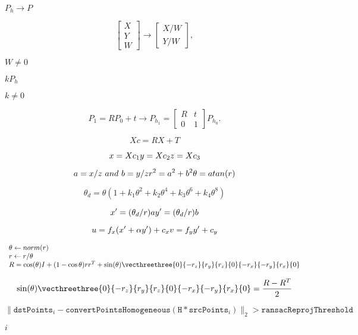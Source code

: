 \documentclass{article}
\begin{document}
$P_h \rightarrow P$
\pagebreak

\[\begin{bmatrix} X \\ Y \\ W \end{bmatrix} \rightarrow \begin{bmatrix} X / W \\ Y / W \end{bmatrix},\]
\pagebreak

$W \ne 0$
\pagebreak

$k P_h$
\pagebreak

$k \ne 0$
\pagebreak

\[P_1 = R P_0 + t \rightarrow P_{h_1} = \begin{bmatrix} R & t \\ 0 & 1 \end{bmatrix} P_{h_0}.\]
\pagebreak

\[Xc = R X + T\]
\pagebreak

\[x = Xc_1 \\ y = Xc_2 \\ z = Xc_3\]
\pagebreak

\[a = x / z \ and \ b = y / z \\ r^2 = a^2 + b^2 \\ \theta = atan(r)\]
\pagebreak

\[\theta_d = \theta (1 + k_1 \theta^2 + k_2 \theta^4 + k_3 \theta^6 + k_4 \theta^8)\]
\pagebreak

\[x' = (\theta_d / r) a \\ y' = (\theta_d / r) b \]
\pagebreak

\[u = f_x (x' + \alpha y') + c_x \\ v = f_y y' + c_y\]
\pagebreak

\[\begin{array}{l} \theta \leftarrow norm(r) \\ r \leftarrow r/ \theta \\ R = \cos(\theta) I + (1- \cos{\theta} ) r r^T + \sin(\theta) \vecthreethree{0}{-r_z}{r_y}{r_z}{0}{-r_x}{-r_y}{r_x}{0} \end{array}\]
\pagebreak

\[\sin ( \theta ) \vecthreethree{0}{-r_z}{r_y}{r_z}{0}{-r_x}{-r_y}{r_x}{0} = \frac{R - R^T}{2}\]
\pagebreak

\[\| \texttt{dstPoints} _i - \texttt{convertPointsHomogeneous} ( \texttt{H} * \texttt{srcPoints} _i) \|_2 > \texttt{ransacReprojThreshold}\]
\pagebreak

$i$
\pagebreak
\end{document}
